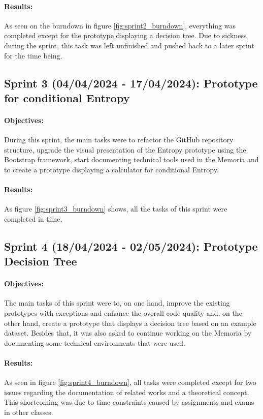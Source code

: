 \paragraph{Results:}
As seen on the burndown in figure \ref{fig:sprint2_burndown}, everything was completed except for the prototype displaying a decision tree. Due to sickness during the sprint, this task was left unfinished and pushed back to a later sprint for the time being.

\subsection{Sprint 3 (04/04/2024 - 17/04/2024): Prototype for conditional Entropy}
\paragraph{Objectives:}
During this sprint, the main tasks were to refactor the GitHub repository structure, upgrade the visual presentation of the Entropy prototype using the Bootstrap framework, start documenting technical tools used in the Memoria and to create a prototype displaying a calculator for conditional Entropy.

\paragraph{Results:}
As figure \ref{fig:sprint3_burndown} shows, all the tasks of this sprint were completed in time.

\subsection{Sprint 4 (18/04/2024 - 02/05/2024): Prototype Decision Tree} \label{sprint_4}
\paragraph{Objectives:}
The main tasks of this sprint were to, on one hand, improve the existing prototypes with exceptions and enhance the overall code quality and, on the other hand, create a prototype that displays a decision tree based on an example dataset. Besides that, it was also asked to continue working on the Memoria by documenting some technical environments that were used.

\paragraph{Results:}
As seen in figure \ref{fig:sprint4_burndown}, all tasks were completed except for two issues regarding the documentation of related works and a theoretical concept. This shortcoming was due to time constraints caused by assignments and exams in other classes.


